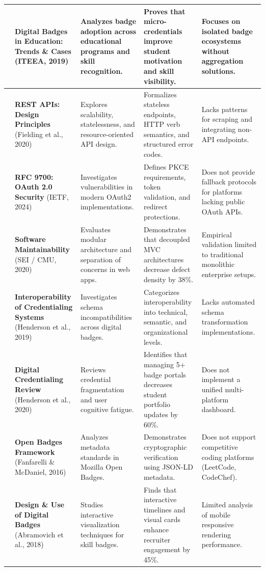 \documentclass[12pt,a4paper]{article}
\begin{document}
\begin{longtable}{|>{\centering\arraybackslash}p{0.8cm}|p{4.2cm}|p{3.8cm}|p{3.8cm}|p{3.0cm}|}
1 & \textbf{Digital Badges in Education: Trends \& Cases} (ITEEA, 2019) & Analyzes badge adoption across educational programs and skill recognition. & Proves that micro-credentials improve student motivation and skill visibility. & Focuses on isolated badge ecosystems without aggregation solutions. \\
\hline
2 & \textbf{REST APIs: Design Principles} (Fielding et al., 2020) & Explores scalability, statelessness, and resource-oriented API design. & Formalizes stateless endpoints, HTTP verb semantics, and structured error codes. & Lacks patterns for scraping and integrating non-API endpoints. \\
\hline
3 & \textbf{RFC 9700: OAuth 2.0 Security} (IETF, 2024) & Investigates vulnerabilities in modern OAuth2 implementations. & Defines PKCE requirements, token validation, and redirect protections. & Does not provide fallback protocols for platforms lacking public OAuth APIs. \\
\hline
4 & \textbf{Software Maintainability} (SEI / CMU, 2020) & Evaluates modular architecture and separation of concerns in web apps. & Demonstrates that decoupled MVC architectures decrease defect density by 38\%. & Empirical validation limited to traditional monolithic enterprise setups. \\
\hline
5 & \textbf{Interoperability of Credentialing Systems} (Henderson et al., 2019) & Investigates schema incompatibilities across digital badges. & Categorizes interoperability into technical, semantic, and organizational levels. & Lacks automated schema transformation implementations. \\
\hline
6 & \textbf{Digital Credentialing Review} (Henderson et al., 2020) & Reviews credential fragmentation and user cognitive fatigue. & Identifies that managing 5+ badge portals decreases student portfolio updates by 60\%. & Does not implement a unified multi-platform dashboard. \\
\hline
7 & \textbf{Open Badges Framework} (Fanfarelli \& McDaniel, 2016) & Analyzes metadata standards in Mozilla Open Badges. & Demonstrates cryptographic verification using JSON-LD metadata. & Does not support competitive coding platforms (LeetCode, CodeChef). \\
\hline
8 & \textbf{Design \& Use of Digital Badges} (Abramovich et al., 2018) & Studies interactive visualization techniques for skill badges. & Finds that interactive timelines and visual cards enhance recruiter engagement by 45\%. & Limited analysis of mobile responsive rendering performance. \\
\hline
\end{longtable}
\end{document}
